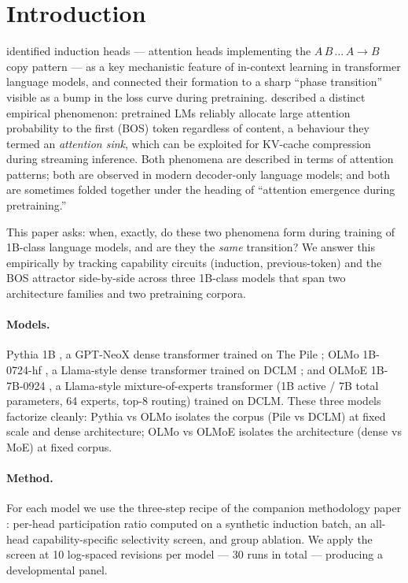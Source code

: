 \documentclass[11pt]{article}
\begin{document}
\section{Introduction}

\citet{olsson2022} identified induction heads --- attention heads
implementing the $A\,B\,\ldots\,A\to B$ copy pattern --- as a key
mechanistic feature of in-context learning in transformer language models,
and connected their formation to a sharp ``phase transition'' visible as a
bump in the loss curve during pretraining. \citet{xiao2024} described a
distinct empirical phenomenon: pretrained LMs reliably allocate large
attention probability to the first (BOS) token regardless of content, a
behaviour they termed an \emph{attention sink}, which can be exploited for
KV-cache compression during streaming inference. Both phenomena are
described in terms of attention patterns; both are observed in modern
decoder-only language models; and both are sometimes folded together under
the heading of ``attention emergence during pretraining.''

This paper asks: when, exactly, do these two phenomena form during training
of 1B-class language models, and are they the \emph{same} transition? We
answer this empirically by tracking capability circuits (induction,
previous-token) and the BOS attractor side-by-side across three 1B-class
models that span two architecture families and two pretraining corpora.

\paragraph{Models.} Pythia 1B \citep{biderman2023}, a GPT-NeoX dense
transformer trained on The Pile \citep{gao2020pile}; OLMo 1B-0724-hf
\citep{groeneveld2024}, a Llama-style dense transformer trained on DCLM
\citep{li2024dclm}; and OLMoE 1B-7B-0924 \citep{muennighoff2024}, a
Llama-style mixture-of-experts transformer (1B active / 7B total
parameters, 64 experts, top-8 routing) trained on DCLM. These three models
factorize cleanly: Pythia vs OLMo isolates the corpus (Pile vs DCLM) at
fixed scale and dense architecture; OLMo vs OLMoE isolates the architecture
(dense vs MoE) at fixed corpus.

\paragraph{Method.} For each model we use the three-step recipe of the
companion methodology paper \citep{paper1_methodology}: per-head
participation ratio computed on a synthetic induction batch, an all-head
capability-specific selectivity screen, and group ablation. We apply the
screen at 10 log-spaced revisions per model --- 30 runs in total ---
producing a developmental panel.
\end{document}

